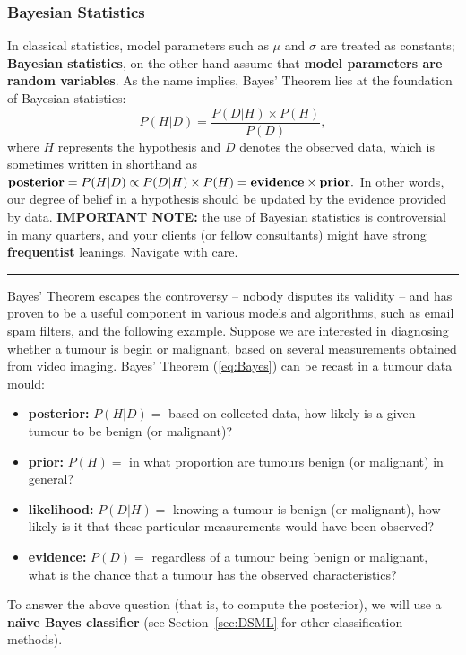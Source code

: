 \subsubsection{Bayesian Statistics}
In classical statistics, model parameters such as $\mu$ and $\sigma$ are treated as constants; \textbf{Bayesian statistics}, on the other hand assume that \textbf{model parameters are random variables}. As the name implies, Bayes' Theorem lies at the foundation of Bayesian statistics: 
\begin{equation}\label{eq:Bayes}
    P(H|D)=\frac{P(D|H)\times P(H)}{P(D)},
\end{equation}
where $H$ represents the hypothesis and $D$ denotes the observed data, which is sometimes written in shorthand as  $\textrm{\textbf{posterior}} = P(H|D) \propto P(D|H)\times P(H) = \textrm{\textbf{evidence}} \times \textrm{\textbf{prior}}.$ In other words, our degree of belief in a hypothesis should be updated by the evidence provided by data. \newpage\noindent \textbf{IMPORTANT NOTE:} the use of Bayesian statistics is controversial in many quarters, and your clients (or fellow consultants) might have strong \textbf{frequentist} leanings. Navigate with care. \begin{center}
    \rule{0.5\textwidth}{.4pt}
\end{center}
Bayes' Theorem escapes the controversy -- nobody disputes its validity -- and has proven to be a useful component in various models and algorithms, such as email spam filters, and the following example. \newl 
Suppose we are interested in diagnosing whether a tumour is begin or malignant, based on several measurements obtained from video imaging. Bayes' Theorem (\ref{eq:Bayes}) can be recast in a tumour data mould:
\begin{itemize}[noitemsep]
    \item \textbf{posterior:} $P(H|D)=$ based on collected data, how likely is a given tumour to be benign (or malignant)?
    \item \textbf{prior:} $P(H)=$ in what proportion are tumours benign (or malignant) in general? 
    \item \textbf{likelihood:} $P(D|H)=$ knowing a tumour is benign (or malignant), how likely is it that these particular measurements would have been observed?
    \item \textbf{evidence:} $P(D)=$ regardless of a tumour being benign or malignant, what is the chance that a tumour has the observed characteristics?
\end{itemize}
To answer the above question (that is, to compute the posterior), we will use a \textbf{na\"{\i}ve Bayes classifier} (see Section~\ref{sec:DSML} for other classification methods).
